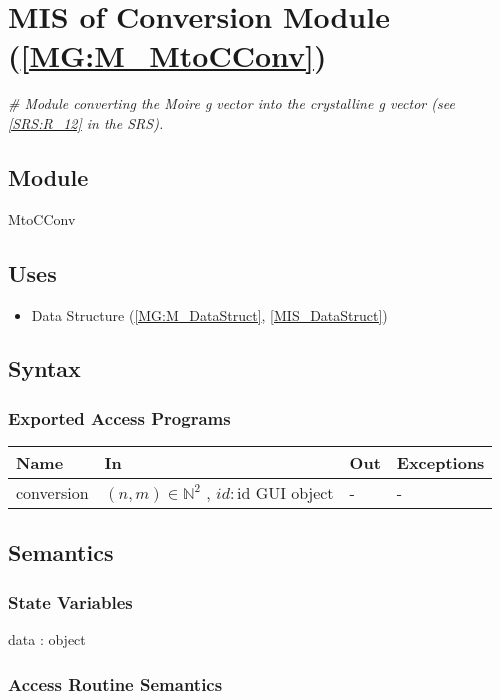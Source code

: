 \documentclass[12pt, titlepage]{article}
\begin{document}
\section{MIS of Conversion Module (\texorpdfstring{\cref{MG:M_MtoCConv}}))} 
\label{MIS_MtoCConv}

\noindent\textit{{\#} Module converting the Moire g vector into the crystalline 
g vector (see \cref{SRS:R_12} in the SRS).}

\subsection{Module}
MtoCConv
\subsection{Uses}
\begin{itemize}
\item Data Structure (\cref{MG:M_DataStruct}, \cref{MIS_DataStruct})
\end{itemize}

\subsection{Syntax}

\subsubsection{Exported Access Programs}

\begin{center}
\begin{tabular}{p{2cm} p{4cm} p{4cm} p{3cm}}
\hline
\textbf{Name} & \textbf{In} & \textbf{Out} & \textbf{Exceptions} \\
\hline
conversion & $(n,m) \in \mathbb{N}^2$ , $id : \text{id GUI object}$  & - & - \\
\hline
\end{tabular}
\end{center}

\subsection{Semantics}

\subsubsection{State Variables}
data : object

\subsubsection{Access Routine Semantics}
\end{document}
